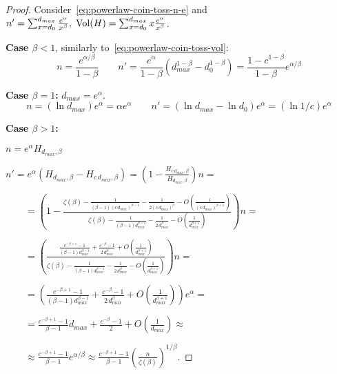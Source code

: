 \begin{proof}
    Consider~\eqref{eq:powerlaw-coin-toss-n-e} and
    $n'=\sum_{x=d_0}^{d_{max}}\frac{e^\alpha}{x^\beta},
    \;\operatorname*{Vol}(H)=\sum_{x=d_0}^{d_{max}}{x\frac{e^\alpha}{x^\beta}}$.
    
    \textbf{Case $\beta<1$}, similarly to~\eqref{eq:powerlaw-coin-toss-vol}:
    \begin{equation*}
        n=\frac{e^{\alpha/\beta}}{1-\beta}
        \qquad n'=\frac{e^\alpha}{1-\beta}\left(d_{max}^{1-\beta}-d_0^{1-\beta}\right)
        =\frac{1-c^{1-\beta}}{1-\beta}e^{\alpha/\beta}
    \end{equation*}
    
    \textbf{Case $\beta=1$:}
    $d_{max}=e^\alpha$.
    \begin{equation*}
        n=\left(\ln d_{max}\right)e^\alpha=\alpha e^\alpha
        \qquad n'=(\ln d_{max}-\ln d_0)e^\alpha=(\ln 1/c)e^\alpha
    \end{equation*}

    \textbf{Case $\beta>1$:}
    
    $n=e^\alpha H_{d_{max},\beta}$
    
    $n'=e^\alpha\left(H_{d_{max},\beta}-H_{c\,d_{max},\beta}\right)
    =\left(1-\frac{H_{c\,d_{max},\beta}}{H_{d_{max},\beta}}\right)n=$
    
    $\qquad=\left(1-\frac{
        \zeta(\beta)-\frac{1}{(\beta-1)(c\,d_{max})^{\beta-1}}-\frac{1}{2(c\,d_{max})^\beta}-O\left(\frac{1}{(c\,d_{max})^{\beta+1}}\right)
    }{
        \zeta(\beta)-\frac{1}{(\beta-1)d_{max}^{\beta-1}}-\frac{1}{2\,d_{max}^\beta}-O\left(\frac{1}{d_{max}^{\beta+1}}\right)
    }\right)n=$

    $\qquad=\left(\frac{
        \frac{c^{-\beta+1}-1}{(\beta-1)d_{max}^{\beta-1}}+\frac{c^{-\beta}-1}{2\,d_{max}^\beta}+O\left(\frac{1}{d_{max}^{\beta+1}}\right)
    }{
        \zeta(\beta)-\frac{1}{(\beta-1)d_{max}^{\beta-1}}-\frac{1}{2\,d_{max}^\beta}-O\left(\frac{1}{d_{max}^{\beta+1}}\right)
    }\right)n=$

    $\qquad=\left(\frac{c^{-\beta+1}-1}{(\beta-1)d_{max}^{\beta-1}}+\frac{c^{-\beta}-1}{2\,d_{max}^\beta}+O\left(\frac{1}{d_{max}^{\beta+1}}\right)\right)e^\alpha=$
    
    $\qquad=\frac{c^{-\beta+1}-1}{\beta-1}d_{max}+\frac{c^{-\beta}-1}{2}+O\left(\frac{1}{d_{max}}\right)\approx$
    
    $\qquad\approx\frac{c^{-\beta+1}-1}{\beta-1}e^{\alpha/\beta}
    \approx\frac{c^{-\beta+1}-1}{\beta-1}\left(\frac{n}{\zeta(\beta)}\right)^{1/\beta}$.
    

\end{proof}
